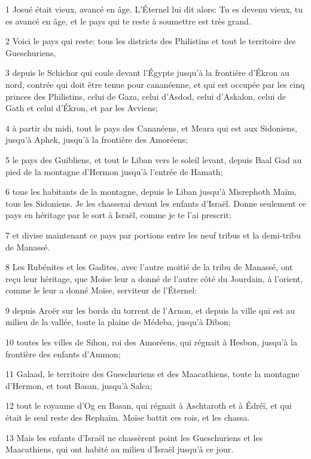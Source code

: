 \par 1 Josué était vieux, avancé en âge. L'Éternel lui dit alors: Tu es devenu vieux, tu es avancé en âge, et le pays qui te reste à soumettre est très grand.
\par 2 Voici le pays qui reste: tous les districts des Philistins et tout le territoire des Gueschuriens,
\par 3 depuis le Schichor qui coule devant l'Égypte jusqu'à la frontière d'Ékron au nord, contrée qui doit être tenue pour cananéenne, et qui est occupée par les cinq princes des Philistins, celui de Gaza, celui d'Asdod, celui d'Askalon, celui de Gath et celui d'Ékron, et par les Avviens;
\par 4 à partir du midi, tout le pays des Cananéens, et Meara qui est aux Sidoniens, jusqu'à Aphek, jusqu'à la frontière des Amoréens;
\par 5 le pays des Guibliens, et tout le Liban vers le soleil levant, depuis Baal Gad au pied de la montagne d'Hermon jusqu'à l'entrée de Hamath;
\par 6 tous les habitants de la montagne, depuis le Liban jusqu'à Misrephoth Maïm, tous les Sidoniens. Je les chasserai devant les enfants d'Israël. Donne seulement ce pays en héritage par le sort à Israël, comme je te l'ai prescrit;
\par 7 et divise maintenant ce pays par portions entre les neuf tribus et la demi-tribu de Manassé.
\par 8 Les Rubénites et les Gadites, avec l'autre moitié de la tribu de Manassé, ont reçu leur héritage, que Moïse leur a donné de l'autre côté du Jourdain, à l'orient, comme le leur a donné Moïse, serviteur de l'Éternel:
\par 9 depuis Aroër sur les bords du torrent de l'Arnon, et depuis la ville qui est au milieu de la vallée, toute la plaine de Médeba, jusqu'à Dibon;
\par 10 toutes les villes de Sihon, roi des Amoréens, qui régnait à Hesbon, jusqu'à la frontière des enfants d'Ammon;
\par 11 Galaad, le territoire des Gueschuriens et des Maacathiens, toute la montagne d'Hermon, et tout Basan, jusqu'à Salca;
\par 12 tout le royaume d'Og en Basan, qui régnait à Aschtaroth et à Édréï, et qui était le seul reste des Rephaïm. Moïse battit ces rois, et les chassa.
\par 13 Mais les enfants d'Israël ne chassèrent point les Gueschuriens et les Maacathiens, qui ont habité au milieu d'Israël jusqu'à ce jour.
